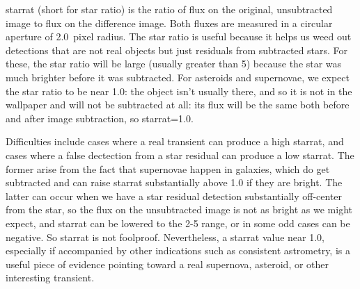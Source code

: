 starrat (short for star ratio) is the ratio of flux on the original, 
unsubtracted image to flux on the difference image. Both fluxes are 
measured in a circular aperture of 2.0~pixel radius. The star ratio 
is useful because it helps us weed out detections that are not real 
objects but just residuals from subtracted stars. For these, the star 
ratio will be large (usually greater than 5) because the star was much 
brighter before it was subtracted. For asteroids and supernovae, we 
expect the star ratio to be near 1.0: the object isn't usually there, 
and so it is not in the wallpaper and will not be subtracted at all: 
its flux will be the same both before and after image subtraction, so starrat=1.0.

Difficulties include cases where a real transient can produce a high 
starrat, and cases where a false dectection from a star residual can 
produce a low starrat. The former arise from the fact that supernovae 
happen in galaxies, which do get subtracted and can raise starrat 
substantially above 1.0 if they are bright. The latter can occur when 
we have a star residual detection substantially off-center from the 
star, so the flux on the unsubtracted image is not as bright as we might 
expect, and starrat can be lowered to the 2-5 range, or in some odd 
cases can be negative. So starrat is not foolproof. Nevertheless, a 
starrat value near 1.0, especially if accompanied by other indications 
such as consistent astrometry, is a useful piece of evidence pointing 
toward a real supernova, asteroid, or other interesting transient.